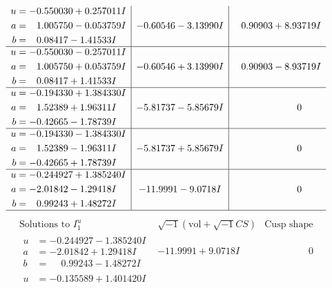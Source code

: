 \documentclass[1p]{elsarticle_modified}
\theoremstyle{definition}
\newcommand{\I}{\sqrt{-1}}
\begin{document}
$$\begin{array}{c|c|c}
\begin{aligned}
u &= -0.550030 + 0.257011 I \\
a &= \phantom{-}1.005750 - 0.053759 I \\
b &= \phantom{-}0.08417 - 1.41533 I\end{aligned}
 & -0.60546 - 3.13990 I & \phantom{-}0.90903 + 8.93719 I \\ \hline\begin{aligned}
u &= -0.550030 - 0.257011 I \\
a &= \phantom{-}1.005750 + 0.053759 I \\
b &= \phantom{-}0.08417 + 1.41533 I\end{aligned}
 & -0.60546 + 3.13990 I & \phantom{-}0.90903 - 8.93719 I \\ \hline\begin{aligned}
u &= -0.194330 + 1.384330 I \\
a &= \phantom{-}1.52389 + 1.96311 I \\
b &= -0.42665 - 1.78739 I\end{aligned}
 & -5.81737 - 5.85679 I & \phantom{-0.000000 } 0 \\ \hline\begin{aligned}
u &= -0.194330 - 1.384330 I \\
a &= \phantom{-}1.52389 - 1.96311 I \\
b &= -0.42665 + 1.78739 I\end{aligned}
 & -5.81737 + 5.85679 I & \phantom{-0.000000 } 0 \\ \hline\begin{aligned}
u &= -0.244927 + 1.385240 I \\
a &= -2.01842 - 1.29418 I \\
b &= \phantom{-}0.99243 + 1.48272 I\end{aligned}
 & -11.9991 - 9.0718 I & \phantom{-0.000000 } 0\\
 \hline 
 \end{array}$$\newpage$$\begin{array}{c|c|c}  
\text{Solutions to }I^u_{1}& \I (\text{vol} + \sqrt{-1}CS) & \text{Cusp shape}\\
 \hline 
\begin{aligned}
u &= -0.244927 - 1.385240 I \\
a &= -2.01842 + 1.29418 I \\
b &= \phantom{-}0.99243 - 1.48272 I\end{aligned}
 & -11.9991 + 9.0718 I & \phantom{-0.000000 } 0 \\ \hline\begin{aligned}
u &= -0.135589 + 1.401420 I \\

\end{aligned}
\end{array}$$
\end{document}
